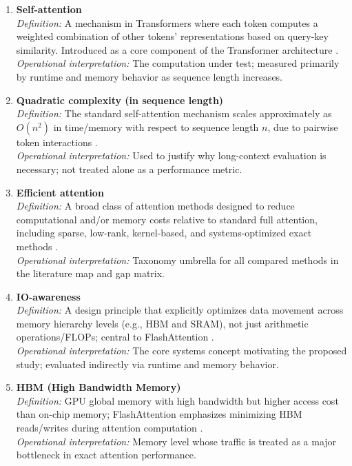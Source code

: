 \documentclass[12pt, a4paper]{article}
\begin{document}
\begin{enumerate}

\item \textbf{Self-attention} \\
\textit{Definition:} A mechanism in Transformers where each token computes a weighted combination of other tokens' representations based on query-key similarity. Introduced as a core component of the Transformer architecture \parencite{vaswani2023attentionneed}. \\
\textit{Operational interpretation:} The computation under test; measured primarily by runtime and memory behavior as sequence length increases.

\item \textbf{Quadratic complexity (in sequence length)} \\
\textit{Definition:} The standard self-attention mechanism scales approximately as $O(n^2)$ in time/memory with respect to sequence length $n$, due to pairwise token interactions \parencite{10.1145/3530811, dao2022flashattentionfastmemoryefficientexact}. \\
\textit{Operational interpretation:} Used to justify why long-context evaluation is necessary; not treated alone as a performance metric.

\item \textbf{Efficient attention} \\
\textit{Definition:} A broad class of attention methods designed to reduce computational and/or memory costs relative to standard full attention, including sparse, low-rank, kernel-based, and systems-optimized exact methods \parencite{10.1145/3530811}. \\
\textit{Operational interpretation:} Taxonomy umbrella for all compared methods in the literature map and gap matrix.

\item \textbf{IO-awareness} \\
\textit{Definition:} A design principle that explicitly optimizes data movement across memory hierarchy levels (e.g., HBM and SRAM), not just arithmetic operations/FLOPs; central to FlashAttention \parencite{dao2022flashattentionfastmemoryefficientexact}. \\
\textit{Operational interpretation:} The core systems concept motivating the proposed study; evaluated indirectly via runtime and memory behavior.

\item \textbf{HBM (High Bandwidth Memory)} \\
\textit{Definition:} GPU global memory with high bandwidth but higher access cost than on-chip memory; FlashAttention emphasizes minimizing HBM reads/writes during attention computation \parencite{dao2022flashattentionfastmemoryefficientexact}. \\
\textit{Operational interpretation:} Memory level whose traffic is treated as a major bottleneck in exact attention performance.


\end{enumerate}
\end{document}
